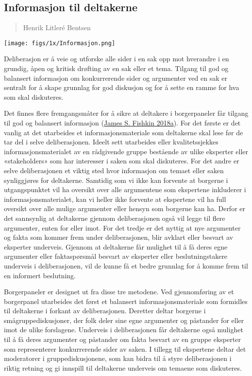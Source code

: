 \documentclass[
  12pt,
  a4paper, 12pt]{article}
\begin{document}
\hypertarget{informasjon-til-deltakerne}{%
\subsection{Informasjon til deltakerne}\label{informasjon-til-deltakerne}}

\begin{quote}
Henrik Litleré Bentsen
\end{quote}

\texttt{[image: figs/1x/Informasjon.png]}

Deliberasjon er å veie og utforske alle sider i en sak opp mot hverandre i en grundig, åpen og kritisk drøfting av en sak eller et tema. Tilgang til god og balansert informasjon om konkurrerende sider og argumenter ved en sak er sentralt for å skape grunnlag for god diskusjon og for å sette en ramme for hva som skal diskuteres.

Det finnes flere fremgangsmåter for å sikre at deltakere i borgerpaneler får tilgang til god og balansert informasjon (\protect\hyperlink{ref-fishkin2018democracy}{James S. Fishkin 2018a}). For det første er det vanlig at det utarbeides et informasjonsmateriale som deltakerne skal lese før de tar del i selve deliberasjonen. Ideelt sett utarbeides eller kvalitetssjekkes informasjonsmaterialet av en rådgivende gruppe bestående av ulike eksperter eller «stakeholders» som har interesser i saken som skal diskuteres. For det andre er selve deliberasjonen et viktig sted hvor informasjon om temaet eller saken synliggjøres for deltakerne. Samtidig som vi ikke kan forvente at borgerne i utgangspunktet vil ha oversikt over alle argumentene som ekspertene inkluderer i informasjonsmaterialet, kan vi heller ikke forvente at ekspertene vil ha full oversikt over alle mulige argumenter eller hensyn som borgerne kan ha. Derfor er det sannsynlig at deltakerne gjennom deliberasjonen også vil legge til flere argumenter, enten for eller imot. For det tredje er det nyttig at nye argumenter og fakta som kommer frem under deliberasjonen, blir avklart eller besvart av eksperter underveis. Gjennom at deltakerne får mulighet til å få deres egne argumenter eller faktaspørsmål besvart av eksperter eller beslutningstakere underveis i deliberasjonen, vil de kunne få et bedre grunnlag for å komme frem til en informert beslutning.

Borgerpaneler er designet ut fra disse tre metodene. Ved gjennomføring av et borgerpanel utarbeides det først et balansert informasjonsmateriale som formidles til deltakerne i forkant av deliberasjonen. Deretter deltar borgerne i smågruppediskusjoner, der folk deler sine egne argumenter og påstander for eller imot de ulike forslagene. Underveis i deliberasjonen får deltakerne også mulighet til å få deres argumenter og påstander om fakta besvart av en gruppe eksperter som representerer konkurrerende sider av saken. I tillegg til ekspertene deltar det moderatorer i gruppediskusjonene, som kan bidra til å styre deliberasjonen i riktig retning og gi innspill til deltakerne underveis om temaene som diskuteres.
\end{document}
